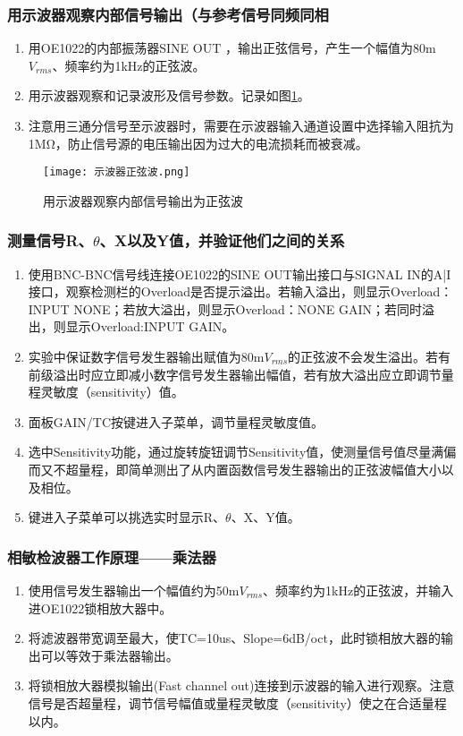 \documentclass[dvipsnames, svgnames,a4paper,11pt]{article}
\begin{document}
	\subsubsection{用示波器观察内部信号输出（与参考信号同频同相}
		\begin{enumerate}
		\item 用OE1022的内部振荡器SINE OUT ，输出正弦信号，产生一个幅值为80m$V_{rms}$、频率约为1kHz的正弦波。
		\item 用示波器观察和记录波形及信号参数。记录如图\ref{fig:示波器正弦波}。
		\item 注意用三通分信号至示波器时，需要在示波器输入通道设置中选择输入阻抗为1MΩ，防止信号源的电压输出因为过大的电流损耗而被衰减。
		\end{enumerate}

		\begin{figure}[htbp]
			\centering
			\texttt{[image: 示波器正弦波.png]}
			\caption{用示波器观察内部信号输出为正弦波}
			\label{fig:示波器正弦波}
		\end{figure}



	\subsubsection{测量信号R、$\theta$、X以及Y值，并验证他们之间的关系}
		\begin{enumerate}
		\item 使用BNC-BNC信号线连接OE1022的SINE OUT输出接口与SIGNAL IN的A|I接口，观察检测栏的Overload是否提示溢出。若输入溢出，则显示Overload：INPUT NONE；若放大溢出，则显示Overload：NONE GAIN；若同时溢出，则显示Overload:INPUT GAIN。
		\item 实验中保证数字信号发生器输出赋值为80m$V_{rms}$的正弦波不会发生溢出。若有前级溢出时应立即减小数字信号发生器输出幅值，若有放大溢出应立即调节量程灵敏度（sensitivity）值。
		\item 面板GAIN/TC按键进入子菜单，调节量程灵敏度值。
		\item 选中Sensitivity功能，通过旋转旋钮调节Sensitivity值，使测量信号值尽量满偏而又不超量程，即简单测出了从内置函数信号发生器输出的正弦波幅值大小以及相位。 
		\item 键进入子菜单可以挑选实时显示R、$\theta$、X、Y值。
		\end{enumerate}

	\subsubsection{相敏检波器工作原理——乘法器}
		\begin{enumerate}
			\item 使用信号发生器输出一个幅值约为50m$V_{rms}$、频率约为1kHz的正弦波，并输入进OE1022锁相放大器中。
			\item 将滤波器带宽调至最大，使TC=10us、Slope=6dB/oct，此时锁相放大器的输出可以等效于乘法器输出。
			\item 将锁相放大器模拟输出(Fast channel out)连接到示波器的输入进行观察。注意信号是否超量程，调节信号幅值或量程灵敏度（sensitivity）使之在合适量程以内。
		\end{enumerate}
	
\end{document}
